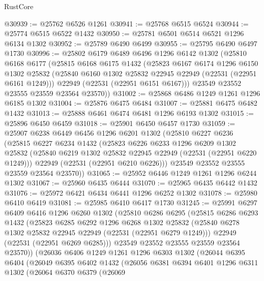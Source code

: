 \begin{lexlean}{RustCore}
\begin{coremodule}
@30939 := @25762 @6526 @1261
@30941 := @25768 @6515 @6524
@30944 := @25774 @6515 @6522 @1432
@30950 := @25781 @6501 @6514 @6521 @1296 @6134 @1302
@30952 := @25789 @6490 @6499
@30955 := @25795 @6490 @6497 @1730
@30996 := @25802
    @6179
    @6489
    @6496
    @1296
    @6142
    @1302
    (@25810
      @6168
      @6177
      (@25815
        @6168
        @6175
        @1432
        (@25823
          @6167
          @6174
          @1296
          @6150
          @1302
          @25832
          (@25840 @6160 @1302 @25832 @22945 @22949 (@22531 (@22951 @6161 @1249)))
          @22949
          (@22531 (@22951 @6151 @6167)))
        @23549
        @23552
        @23555
        @23559
        @23564
        @23570))
@31002 := @25868 @6486 @1249 @1261 @1296 @6185 @1302
@31004 := @25876 @6475 @6484
@31007 := @25881 @6475 @6482 @1432
@31013 := @25888 @6461 @6474 @6481 @1296 @6193 @1302
@31015 := @25896 @6450 @6459
@31018 := @25901 @6450 @6457 @1730
@31059 := @25907
    @6238
    @6449
    @6456
    @1296
    @6201
    @1302
    (@25810
      @6227
      @6236
      (@25815
        @6227
        @6234
        @1432
        (@25823
          @6226
          @6233
          @1296
          @6209
          @1302
          @25832
          (@25840 @6219 @1302 @25832 @22945 @22949 (@22531 (@22951 @6220 @1249)))
          @22949
          (@22531 (@22951 @6210 @6226)))
        @23549
        @23552
        @23555
        @23559
        @23564
        @23570))
@31065 := @25952 @6446 @1249 @1261 @1296 @6244 @1302
@31067 := @25960 @6435 @6444
@31070 := @25965 @6435 @6442 @1432
@31076 := @25972 @6421 @6434 @6441 @1296 @6252 @1302
@31078 := @25980 @6410 @6419
@31081 := @25985 @6410 @6417 @1730
@31245 := @25991
    @6297
    @6409
    @6416
    @1296
    @6260
    @1302
    (@25810
      @6286
      @6295
      (@25815
        @6286
        @6293
        @1432
        (@25823
          @6285
          @6292
          @1296
          @6268
          @1302
          @25832
          (@25840 @6278 @1302 @25832 @22945 @22949 (@22531 (@22951 @6279 @1249)))
          @22949
          (@22531 (@22951 @6269 @6285)))
        @23549
        @23552
        @23555
        @23559
        @23564
        @23570))
    (@26036
      @6406
      @1249
      @1261
      @1296
      @6303
      @1302
      (@26044
        @6395
        @6404
        (@26049
          @6395
          @6402
          @1432
          (@26056
            @6381
            @6394
            @6401
            @1296
            @6311
            @1302
            (@26064
              @6370
              @6379
              (@26069

\end{coremodule}
\end{lexlean}
